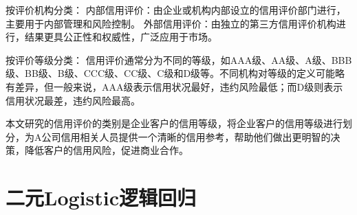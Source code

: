 按评价机构分类：
内部信用评价：由企业或机构内部设立的信用评价部门进行，主要用于内部管理和风险控制。
外部信用评价：由独立的第三方信用评价机构进行，结果更具公正性和权威性，广泛应用于市场。

按评价等级分类：
信用评价通常分为不同的等级，如AAA级、AA级、A级、BBB级、BB级、B级、CCC级、CC级、C级和D级等。不同机构对等级的定义可能略有差异，但一般来说，AAA级表示信用状况最好，违约风险最低；而D级则表示信用状况最差，违约风险最高。

本文研究的信用评价的类别是企业客户的信用等级，将企业客户的信用等级进行划分，为A公司信用相关人员提供一个清晰的信用参考，帮助他们做出更明智的决策，降低客户的信用风险，促进商业合作。 




\section{二元Logistic逻辑回归}



